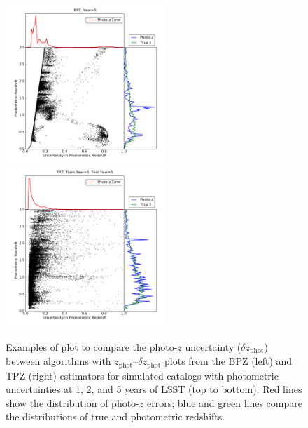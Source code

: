\documentclass[DM,lsstdraft,toc]{lsstdoc}
\begin{document}
\begin{figure}
\begin{center}
\includegraphics[width=6cm,trim={1cm 1cm 1cm 0cm}, clip]{figures/zp_zpe_bpz_euclid_5_2.png}
\includegraphics[width=6cm,trim={1cm 1cm 1cm 0cm}, clip]{figures/zp_zpe_tpz_euclid_5_5_2.png}
\caption{Examples of plot to compare the photo-$z$ uncertainty ($\delta z_\mathrm{phot}$) between algorithms with $z_\mathrm{phot}$--$\delta z_\mathrm{phot}$ plots from the BPZ (left) and TPZ (right) estimators for simulated catalogs with photometric uncertainties at 1, 2, and 5 years of LSST (top to bottom). Red lines show the distribution of photo-$z$ errors; blue and green lines compare the distributions of true and photometric redshifts. \label{fig:pzpze}}
\end{center}
\end{figure}
\end{document}
